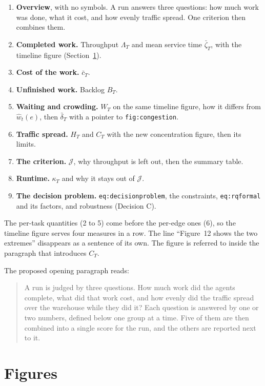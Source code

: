 \documentclass[11pt,a4paper]{article}
\begin{document}
\begin{enumerate}[nosep]
  \item \textbf{Overview}, with no symbols. A run answers three questions:
    how much work was done, what it cost, and how evenly traffic spread.
    One criterion then combines them.
  \item \textbf{Completed work.} Throughput $\Lambda_T$ and mean service
    time $\bar\zeta_T$, with the timeline figure (Section~\ref{sec:figs}).
  \item \textbf{Cost of the work.} $\bar c_T$.
  \item \textbf{Unfinished work.} Backlog $B_T$.
  \item \textbf{Waiting and crowding.} $W_T$ on the same timeline figure,
    how it differs from $\hat w_t(e)$, then $\bar\delta_T$ with a pointer
    to \texttt{fig:congestion}.
  \item \textbf{Traffic spread.} $H_T$ and $C_T$ with the new
    concentration figure, then its limits.
  \item \textbf{The criterion.} $\mathcal{J}$, why throughput is left out,
    then the summary table.
  \item \textbf{Runtime.} $\kappa_T$ and why it stays out of
    $\mathcal{J}$.
  \item \textbf{The decision problem.} \texttt{eq:decisionproblem}, the
    constraints, \texttt{eq:rqformal} and its factors, and robustness
    (Decision C).
\end{enumerate}

\noindent The per-task quantities (2 to 5) come before the per-edge ones
(6), so the timeline figure serves four measures in a row. The line
``Figure~12 shows the two extremes'' disappears as a sentence of its own.
The figure is referred to inside the paragraph that introduces $C_T$.

The proposed opening paragraph reads:

\begin{quote}\small
A run is judged by three questions. How much work did the agents
complete, what did that work cost, and how evenly did the traffic spread
over the warehouse while they did it? Each question is answered by one or
two numbers, defined below one group at a time. Five of them are then
combined into a single score for the run, and the others are reported
next to it.
\end{quote}

\section{Figures}
\label{sec:figs}
\end{document}
